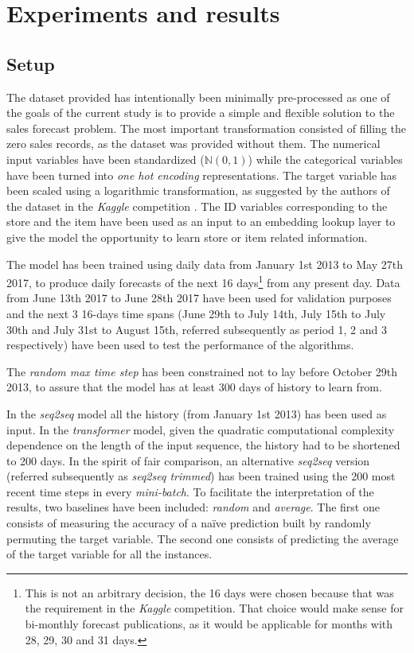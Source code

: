 \section{Experiments and results} \label{sec:salesforecast_results}
\subsection{Setup}
The dataset provided has intentionally been minimally pre-processed as one of the goals of the current study is to provide a simple and flexible solution to the sales forecast problem. The most important transformation consisted of filling the zero sales records, as the dataset was provided without them. The numerical input variables have been standardized ($\mathbb{N}(0,1)$) while the categorical variables have been turned into \textit{one hot encoding} representations. The target variable has been scaled using a logarithmic transformation, as suggested by the authors of the dataset in the \textit{Kaggle} competition \autocite{corporacionfavoritadataset2018}. The ID variables corresponding to the store and the item have been used as an input to an embedding lookup layer to give the model the opportunity to learn store or item related information.

The model has been trained using daily data from January 1st 2013 to May 27th 2017, to produce daily forecasts of the next 16 days\footnote{This is not an arbitrary decision, the 16 days were chosen because that was the requirement in the \textit{Kaggle} competition. That choice would make sense for bi-monthly forecast publications, as it would be applicable for months with 28, 29, 30 and 31 days.} from any present day. Data from  June 13th 2017 to June 28th 2017 have been used for validation purposes and the next 3 16-days time spans (June 29th to July 14th, July 15th to July 30th and July 31st to August 15th, referred subsequently as period 1, 2 and 3 respectively) have been used to test the performance of the algorithms.

The \textit{random max time step} has been constrained not to lay before October 29th 2013, to assure that the model has at least 300 days of history to learn from.

In the \textit{seq2seq} model all the history (from January 1st 2013) has been used as input.  In the \textit{transformer} model, given the quadratic computational complexity dependence on the length of the input sequence, the history had to be shortened to 200 days. In the spirit of fair comparison, an alternative \textit{seq2seq} version (referred subsequently as \textit{seq2seq trimmed}) has been trained using the 200 most recent time steps in every \textit{mini-batch}. To facilitate the interpretation of the results, two baselines have been included: \textit{random} and \textit{average}. The first one consists of measuring the accuracy of a naïve prediction built by randomly permuting the target variable. The second one consists of predicting the average of the target variable for all the instances.

